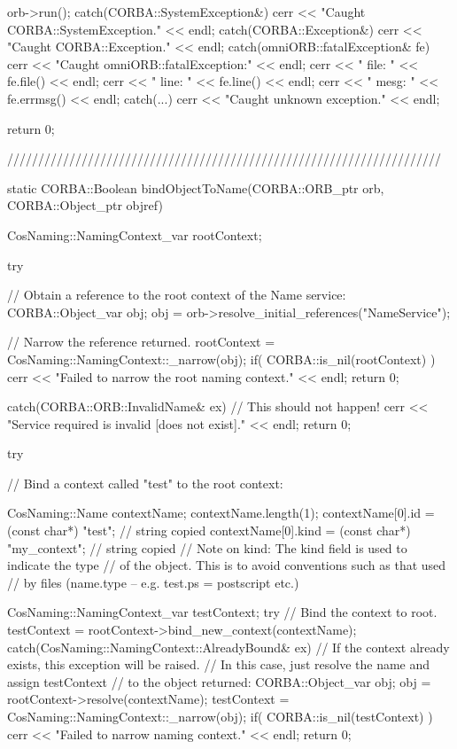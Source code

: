 \documentclass[11pt,twoside,a4paper]{book}
\begin{document}
\begin{cxxlisting}
{{    orb->run();
  }
  catch(CORBA::SystemException&) {
    cerr << "Caught CORBA::SystemException." << endl;
  }
  catch(CORBA::Exception&) {
    cerr << "Caught CORBA::Exception." << endl;
  }
  catch(omniORB::fatalException& fe) {
    cerr << "Caught omniORB::fatalException:" << endl;
    cerr << "  file: " << fe.file() << endl;
    cerr << "  line: " << fe.line() << endl;
    cerr << "  mesg: " << fe.errmsg() << endl;
  }
  catch(...) {
    cerr << "Caught unknown exception." << endl;
  }

  return 0;
}

//////////////////////////////////////////////////////////////////////

static CORBA::Boolean
bindObjectToName(CORBA::ORB_ptr orb, CORBA::Object_ptr objref)
{
  CosNaming::NamingContext_var rootContext;

  try {
    // Obtain a reference to the root context of the Name service:
    CORBA::Object_var obj;
    obj = orb->resolve_initial_references("NameService");

    // Narrow the reference returned.
    rootContext = CosNaming::NamingContext::_narrow(obj);
    if( CORBA::is_nil(rootContext) ) {
      cerr << "Failed to narrow the root naming context." << endl;
      return 0;
    }
  }
  catch(CORBA::ORB::InvalidName& ex) {
    // This should not happen!
    cerr << "Service required is invalid [does not exist]." << endl;
    return 0;
  }

  try {
    // Bind a context called "test" to the root context:

    CosNaming::Name contextName;
    contextName.length(1);
    contextName[0].id   = (const char*) "test";       // string copied
    contextName[0].kind = (const char*) "my_context"; // string copied
    // Note on kind: The kind field is used to indicate the type
    // of the object. This is to avoid conventions such as that used
    // by files (name.type -- e.g. test.ps = postscript etc.)

    CosNaming::NamingContext_var testContext;
    try {
      // Bind the context to root.
      testContext = rootContext->bind_new_context(contextName);
    }
    catch(CosNaming::NamingContext::AlreadyBound& ex) {
      // If the context already exists, this exception will be raised.
      // In this case, just resolve the name and assign testContext
      // to the object returned:
      CORBA::Object_var obj;
      obj = rootContext->resolve(contextName);
      testContext = CosNaming::NamingContext::_narrow(obj);
      if( CORBA::is_nil(testContext) ) {
        cerr << "Failed to narrow naming context." << endl;
        return 0;
      }
    }

}}
\end{cxxlisting}
\end{document}
